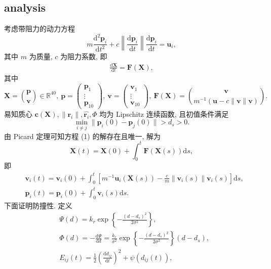 \documentclass{article}
\theoremstyle{definition} %
\begin{document}
\subsection{analysis}
考虑带阻力的动力方程
\begin{equation*}
    m\frac{\mathrm{d}^2\boldsymbol{p}_i}{\mathrm{d}t^2}+c\left\|\frac{\mathrm{d}\boldsymbol{p}_i}{\mathrm{d}t}\right\|\frac{\mathrm{d}\boldsymbol{p}_i}{\mathrm{d}t}=\boldsymbol{u}_i,
\end{equation*}
其中 $m$ 为质量, $c$ 为阻力系数, 即
\begin{align}
    \frac{\mathrm{d}\boldsymbol{X}}{\mathrm{d}t}=\boldsymbol{F}(\boldsymbol{X}),
\end{align}
其中
\begin{equation*}
    \boldsymbol{X}=\binom{\boldsymbol{p}}{\boldsymbol{v}}\in\mathbb{R}^{40},\ \boldsymbol{p}=\begin{pmatrix}
        \boldsymbol{p}_1 \\\vdots\\\boldsymbol{p}_{10}
    \end{pmatrix},\ \boldsymbol{v}=\begin{pmatrix}
        \boldsymbol{v}_1 \\\vdots\\\boldsymbol{v}_{10}
    \end{pmatrix},\ \boldsymbol{F}(\boldsymbol{X})=\binom{\boldsymbol{v}}{m^{-1}(\boldsymbol{u}-c\|\boldsymbol{v}\|\boldsymbol{v})}.
\end{equation*}
易知质心 $\boldsymbol{c}(\boldsymbol{X}),\|\boldsymbol{r}_i\|,\widehat{\boldsymbol{r}_i},\mathit{\Phi}$ 均为 Lipschitz 连续函数, 且初值条件满足
\begin{equation*}
    \min_{i\ne j}\|\boldsymbol{p}_i(0)-\boldsymbol{p}_j(0)\|>d_s>0.
\end{equation*}
由 Picard 定理可知方程 (1) 的解存在且唯一, 解为
\begin{equation*}
    \boldsymbol{X}(t)=\boldsymbol{X}(0)+\int_0^t\boldsymbol{F}(\boldsymbol{X}(s))\mathrm{d}s,
\end{equation*}
即
\begin{align*}
     & \boldsymbol{v}_i(t)=\boldsymbol{v}_i(0)+\int_0^t\left[m^{-1}\boldsymbol{u}_i(\boldsymbol{X}(s))-\frac{c}{m}\|\boldsymbol{v}_i(s)\|\boldsymbol{v}_i(s)\right]\mathrm{d}s, \\
     & \boldsymbol{p}_i(t)=\boldsymbol{p}_i(0)+\int_0^t\boldsymbol{v}_i(s)\mathrm{d}s.
\end{align*}
下面证明防撞性. 定义
\begin{align*}
     & \mathit{\Psi}(d)=k_r\exp\left\{-\frac{(d-d_s)^2}{2\sigma^2}\right\},                                                                      \\
     & \mathit{\Phi}(d)=-\frac{\mathrm{d}\mathit{\Psi}}{\mathrm{d}d}=\frac{k_r}{\sigma^2}\exp\left\{-\frac{(d-d_s)^2}{2\sigma^2}\right\}(d-d_s), \\
     & E_{ij}(t)=\frac{1}{2}\left(\frac{\mathrm{d}d_{ij}}{\mathrm{d}t}\right)^2+\psi(d_{ij}(t)),
\end{align*}
\end{document}
